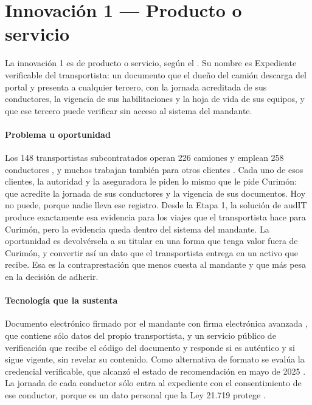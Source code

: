 \section{Innovación 1 — Producto o servicio}\label{sec:13-innovacion-1}

La innovación 1 es de producto o servicio, según el . Su nombre es Expediente verificable
del transportista: un documento que el dueño del camión descarga del portal y presenta a cualquier
tercero, con la jornada acreditada de sus conductores, la vigencia de sus habilitaciones y la hoja de
vida de sus equipos, y que ese tercero puede verificar sin acceso al sistema del mandante.

\paragraph{Problema u oportunidad} Los 148 transportistas subcontratados operan 226 camiones y emplean
258 conductores , y muchos trabajan también para otros clientes
. Cada uno de esos clientes, la autoridad y la aseguradora le piden lo mismo que
le pide Curimón: que acredite la jornada de sus conductores y la vigencia de sus documentos. Hoy no
puede, porque nadie lleva ese registro. Desde la Etapa 1, la solución de audIT produce exactamente esa
evidencia para los viajes que el transportista hace para Curimón, pero la evidencia queda dentro del
sistema del mandante. La oportunidad es devolvérsela a su titular en una forma que tenga valor fuera
de Curimón, y convertir así un dato que el transportista entrega en un activo que recibe. Esa es la
contraprestación que menos cuesta al mandante y que más pesa en la decisión de adherir.

\paragraph{Tecnología que la sustenta} Documento electrónico firmado por el mandante con firma
electrónica avanzada \parencite{ley19799}, que contiene sólo datos del propio transportista, y un
servicio público de verificación que recibe el código del documento y responde si es auténtico y si
sigue vigente, sin revelar su contenido. Como alternativa de formato se evalúa la credencial
verificable, que alcanzó el estado de recomendación en mayo de 2025 \parencite{w3c_vcdm2}. La jornada
de cada conductor sólo entra al expediente con el consentimiento de ese conductor, porque es un dato
personal que la Ley 21.719 protege \parencite{ley21719}.

